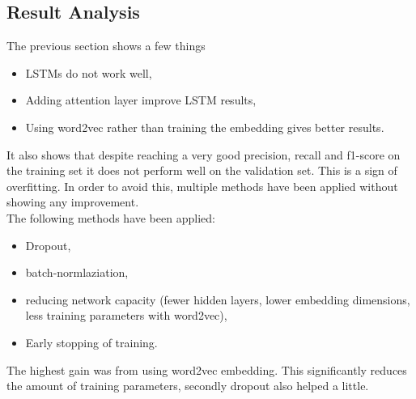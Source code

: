 \subsection{Result Analysis}
The previous section shows a few things
\begin{itemize}
 \item LSTMs do not work well,
 \item Adding attention layer improve LSTM results,
 \item Using word2vec rather than training the embedding gives better results.
\end{itemize}
It also shows that despite reaching a very good precision, recall and f1-score on the training set it does not perform well on the validation set. This is a sign of overfitting. In order to avoid this, multiple methods have been applied without showing any improvement. \\
{}
The following methods have been applied: 
\begin{itemize}
 \item Dropout\cite{srivastava2014dropout}, 
 \item batch-normlaziation\cite{Ioffe2015},
 \item reducing network capacity (fewer hidden layers, lower embedding dimensions, less training parameters with word2vec),
 \item Early stopping of training.
\end{itemize}
The highest gain was from using word2vec embedding. This significantly reduces the amount of training parameters, secondly dropout also helped a little. 
